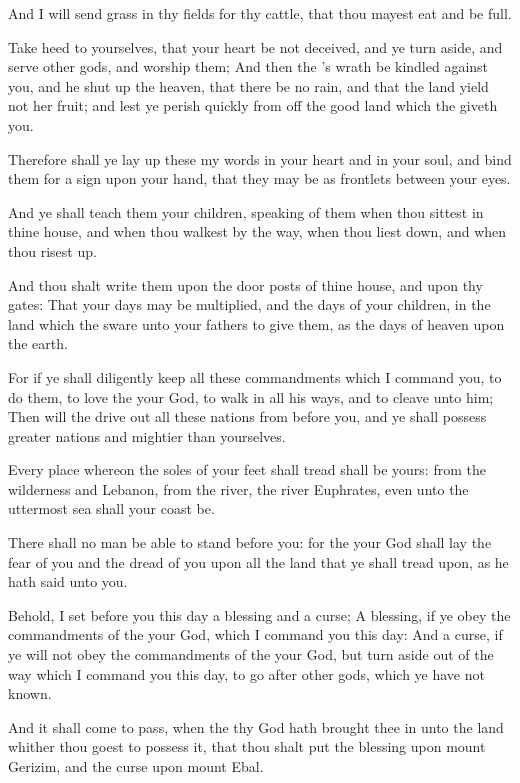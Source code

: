 \verse And I will send grass in thy fields for thy cattle, that thou mayest eat and be full.

\verse Take heed to yourselves, that your heart be not deceived, and ye turn aside, and serve other gods, and worship them; \verse And then the \LORD's wrath be kindled against you, and he shut up the heaven, that there be no rain, and that the land yield not her fruit; and lest ye perish quickly from off the good land which the \LORD giveth you.

\verse Therefore shall ye lay up these my words in your heart and in your soul, and bind them for a sign upon your hand, that they may be as frontlets between your eyes.

\verse And ye shall teach them your children, speaking of them when thou sittest in thine house, and when thou walkest by the way, when thou liest down, and when thou risest up.

\verse And thou shalt write them upon the door posts of thine house, and upon thy gates: \verse That your days may be multiplied, and the days of your children, in the land which the \LORD sware unto your fathers to give them, as the days of heaven upon the earth.

\verse For if ye shall diligently keep all these commandments which I command you, to do them, to love the \LORD your God, to walk in all his ways, and to cleave unto him; \verse Then will the \LORD drive out all these nations from before you, and ye shall possess greater nations and mightier than yourselves.

\verse Every place whereon the soles of your feet shall tread shall be yours: from the wilderness and Lebanon, from the river, the river Euphrates, even unto the uttermost sea shall your coast be.

\verse There shall no man be able to stand before you: for the \LORD your God shall lay the fear of you and the dread of you upon all the land that ye shall tread upon, as he hath said unto you.

\verse Behold, I set before you this day a blessing and a curse; \verse A blessing, if ye obey the commandments of the \LORD your God, which I command you this day: \verse And a curse, if ye will not obey the commandments of the \LORD your God, but turn aside out of the way which I command you this day, to go after other gods, which ye have not known.

\verse And it shall come to pass, when the \LORD thy God hath brought thee in unto the land whither thou goest to possess it, that thou shalt put the blessing upon mount Gerizim, and the curse upon mount Ebal.

